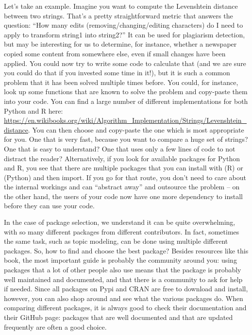 Let's take an example. Imagine you want to compute the Levenshtein distance between two
strings. That's a pretty straightforward metric that answers the question: ``How many
edits (removing/changing/editing characters) do I need to apply to transform string1 into string2?''
It can be used for plagiarism detection, but may be interesting for us to determine, for instance,
whether a newspaper copied some content from somewhere else, even if small changes have been
applied. You could now try to write some code to calculate that (and we are sure you could
do that if you invested some time in it!), but it is such a common problem that it
has been solved multiple times before. You could, for instance,  look up some
functions that are known to solve the problem and copy-paste them into your code. You can find
a large number of different implementations for both Python and R here:
\url{https://en.wikibooks.org/wiki/Algorithm_Implementation/Strings/Levenshtein\_distance}.
You can then choose and copy-paste the one which is most appropriate for you. One that is very fast, because
you want to compare a huge set of strings? One that is easy to understand? One that uses
only a few lines of code to not distract the reader?
Alternatively, if you look for available packages for Python and R, you see that there are
multiple packages that you can install with  (R) or  (Python)
and then import. If you go for that route, you don't need
to care about the internal workings and can ``abstract away'' and outsource the problem -- on the other
hand, the users of your code now have one more dependency to install before they can
use your code.

In the case of package selection, we understand it can be quite overwhelming,
with so many different packages from different contributors.
In fact, sometimes the same task, such as topic modeling,
can be done using multiple different packages.
So, how to find and choose the best package?
Besides resources like this book, the most important guide is probably the community around you:
using packages that a lot of other people also use means that the package is probably well maintained and documented,
and that there is a community to ask for help if needed.
Since all packages on Pypi and CRAN are free to download and install, however, you can also shop around and see what the various packages do.
When comparing different packages, it is always good to check their documentation and their GitHub page:
packages that are well documented and that are updated frequently are often a good choice.

